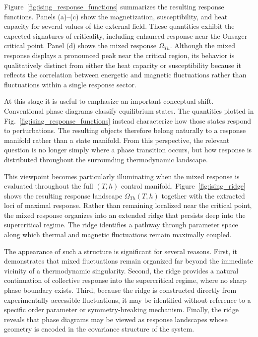 Figure~\ref{fig:ising_response_functions} summarizes the
resulting response functions. Panels (a)–(c) show the
magnetization, susceptibility, and heat capacity for several
values of the external field. These quantities exhibit the
expected signatures of criticality, including enhanced response
near the Onsager critical point. Panel (d) shows the mixed
response \(\Omega_{Th}\). Although the mixed response displays
a pronounced peak near the critical region, its behavior is
qualitatively distinct from either the heat capacity or
susceptibility because it reflects the correlation between
energetic and magnetic fluctuations rather than fluctuations
within a single response sector.

At this stage it is useful to emphasize an important conceptual
shift. Conventional phase diagrams classify equilibrium states.
The quantities plotted in Fig.~\ref{fig:ising_response_functions}
instead characterize how those states respond to perturbations.
The resulting objects therefore belong naturally to a response
manifold rather than a state manifold. From this perspective,
the relevant question is no longer simply where a phase
transition occurs, but how response is distributed throughout
the surrounding thermodynamic landscape.




This viewpoint becomes particularly illuminating when the mixed
response is evaluated throughout the full \((T,h)\) control
manifold. Figure~\ref{fig:ising_ridge} shows the resulting
response landscape \(\Omega_{Th}(T,h)\) together with the
extracted loci of maximal response. Rather than remaining
localized near the critical point, the mixed response organizes
into an extended ridge that persists deep into the
supercritical regime. The ridge identifies a pathway through
parameter space along which thermal and magnetic fluctuations
remain maximally coupled.

The appearance of such a structure is significant for several
reasons. First, it demonstrates that mixed fluctuations remain
organized far beyond the immediate vicinity of a thermodynamic
singularity. Second, the ridge provides a natural continuation
of collective response into the supercritical regime, where no
sharp phase boundary exists. Third, because the ridge is
constructed directly from experimentally accessible
fluctuations, it may be identified without reference to a
specific order parameter or symmetry-breaking mechanism.
Finally, the ridge reveals that phase diagrams may be viewed as
response landscapes whose geometry is encoded in the covariance
structure of the system.

